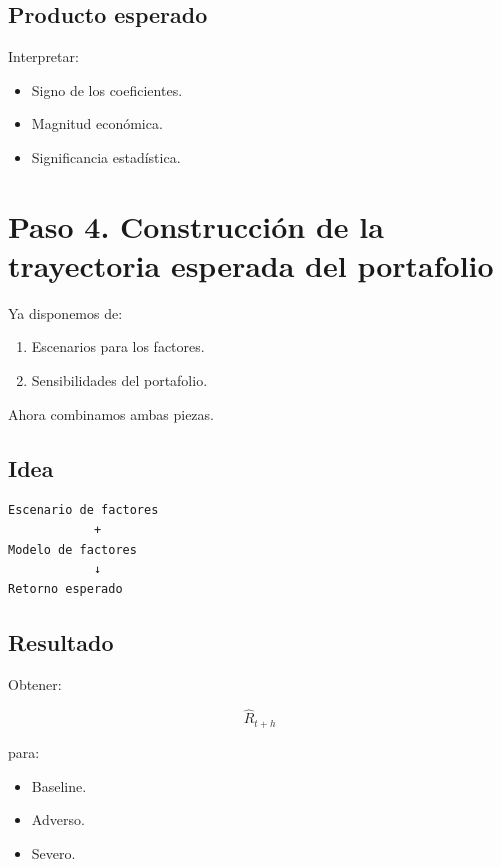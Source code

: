 \documentclass[11pt]{article}
\begin{document}
\subsection*{Producto esperado}

Interpretar:

\begin{itemize}
\item Signo de los coeficientes.
\item Magnitud económica.
\item Significancia estadística.
\end{itemize}

\section{Paso 4. Construcción de la trayectoria esperada del portafolio}

Ya disponemos de:

\begin{enumerate}
\item Escenarios para los factores.
\item Sensibilidades del portafolio.
\end{enumerate}

Ahora combinamos ambas piezas.

\subsection*{Idea}

\begin{center}
\begin{verbatim}
Escenario de factores
            +
Modelo de factores
            ↓
Retorno esperado
\end{verbatim}
\end{center}

\subsection*{Resultado}

Obtener:

\[
\widehat{R}_{t+h}
\]

para:

\begin{itemize}
\item Baseline.
\item Adverso.
\item Severo.
\end{itemize}
\end{document}
